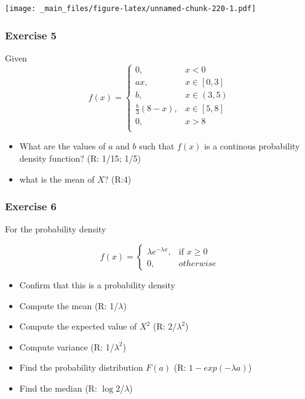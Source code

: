 \documentclass[
]{book}
\providecommand{\tightlist}{%
  \setlength{\itemsep}{0pt}\setlength{\parskip}{0pt}}
\begin{document}
\texttt{[image: \_main\_files/figure-latex/unnamed-chunk-220-1.pdf]}

\hypertarget{exercise-5-1}{%
\subsubsection{Exercise 5}\label{exercise-5-1}}

Given
\[
    f(x)= 
\begin{cases}
0, & x < 0 \\
ax, & x \in [0,3] \\
b, & x \in (3,5) \\
\frac{b}{3}(8-x),& x \in [5,8]\\
0, & x > 8 \\
\end{cases}
\]

\begin{itemize}
\item
  What are the values of \(a\) and \(b\) such that \(f(x)\) is a continous probability density function? (R: 1/15; 1/5)
\item
  what is the mean of \(X\)? (R:4)
\end{itemize}

\hypertarget{exercise-6}{%
\subsubsection{Exercise 6}\label{exercise-6}}

For the probability density

\[
    f(x)= 
\begin{cases}
    \lambda e^{-\lambda x},& \text{if } x \geq 0\\
    0,& otherwise 
\end{cases}
\]

\begin{itemize}
\tightlist
\item
  Confirm that this is a probability density
\item
  Compute the mean (R: 1/\(\lambda\))
\item
  Compute the expected value of \(X^2\) (R: 2/\(\lambda^2\))
\item
  Compute variance (R: 1/\(\lambda^2\))
\item
  Find the probability distribution \(F(a)\) (R: \(1-exp(-\lambda a)\))
\item
  Find the median (R: \(\log{2}\)/\(\lambda\))
\end{itemize}
\end{document}
